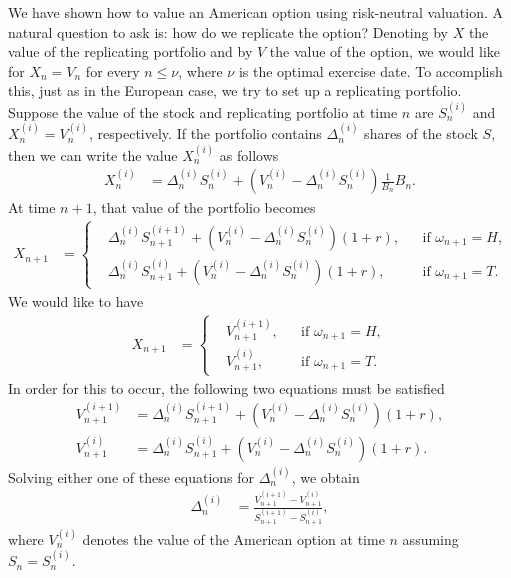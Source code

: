 \documentclass[12pt]{book}
\numberwithin{equation}{chapter}
\theoremstyle{plain}
\numberwithin{theorem}{section}
\theoremstyle{definition}
\numberwithin{exercise}{chapter}
\newcommand{\<}{\langle}
\renewcommand{\>}{\rangle}
\renewcommand{\(}{\left(}
\renewcommand{\)}{\right)}
\renewcommand{\[}{\left[}
\renewcommand{\]}{\right]}
\newcommand\om{\omega}
\newcommand\Del{\Delta}
\theoremstyle{definition}
\numberwithin{question}{section}
\begin{document}
\noindent
We have shown how to value an American option using risk-neutral valuation.  A natural question to ask is: how do we replicate the option?  Denoting by $X$ the value of the replicating portfolio and by $V$ the value of the option, we would like for $X_n = V_n$ for every $n \leq \nu$, where $\nu$ is the optimal exercise date.  To accomplish this, just as in the European case, we try to set up a replicating portfolio.
Suppose the value of the stock and replicating portfolio at time $n$ are $S_n^{(i)}$ and $X_n^{(i)} = V_n^{(i)}$, respectively.  If the portfolio contains $\Del_n^{(i)}$ shares of the stock $S$, then we can write the value $X_n^{(i)}$ as follows
\begin{align}
X_n^{(i)}
	&=	\Del_n^{(i)} S_n^{(i)} + (V_n^{(i)} - \Del_n^{(i)} S_n^{(i)}) \frac{1}{B_n} B_n .
\end{align}
At time $n+1$, that value of the portfolio becomes
\begin{align}
X_{n + 1}
	&= 	\left\{ \begin{aligned}
			&\Del_n^{(i)} S_{n+1}^{(i+1)} + (V_n^{(i)} - \Del_n^{(i)} S_n^{(i)}) (1+r), && \text{if $\om_{n+1}=H$},\\
			&\Del_n^{(i)} S_{n+1}^{(i)} + (V_n^{(i)} - \Del_n^{(i)} S_n^{(i)}) (1+r), && \text{if $\om_{n+1}=T$}.
			\end{aligned} \right. 
\end{align}
We would like to have
\begin{align}
X_{n + 1}
	&= 	\left\{ \begin{aligned}
			&V_{n+1}^{(i+1)}, && \text{if $\om_{n+1}=H$},\\
			&V_{n+1}^{(i)}, && \text{if $\om_{n+1}=T$}.
			\end{aligned} \right. 
\end{align}
In order for this to occur, the following two equations must be satisfied
\begin{align}
V_{n+1}^{(i+1)} 
	&=	\Del_n^{(i)} S_{n+1}^{(i+1)} + (V_n^{(i)} - \Del_n^{(i)} S_n^{(i)}) (1+r) , \label{eq:american-1} \\
V_{n+1}^{(i)}
	&=	\Del_n^{(i)} S_{n+1}^{(i)} + (V_n^{(i)} - \Del_n^{(i)} S_n^{(i)}) (1+r) . \label{eq:american-2}
\end{align}
Solving either one of these equations for $\Del_n^{(i)}$, we obtain
\begin{align}
\Del_n^{(i)}
	&=	\frac{V_{n+1}^{(i+1)} - V_{n+1}^{(i)}}{S_{n+1}^{(i+1)} - S_{n+1}^{(i)} } , 
\end{align}
where $V_n^{(i)}$ denotes the value of the American option at time $n$ assuming $S_n = S_n^{(i)}$.
\end{document}
